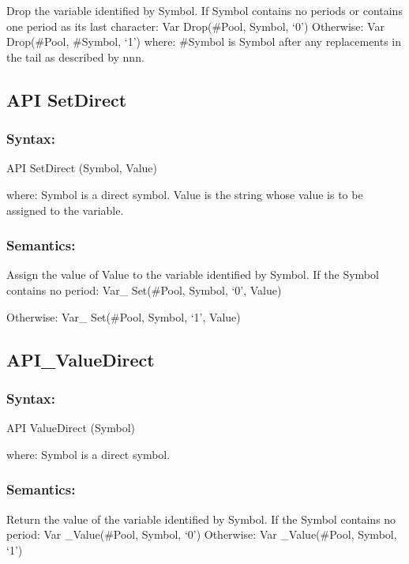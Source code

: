 Drop the variable identified by Symbol. If Symbol contains no periods or
contains one period as its last character: Var Drop(\#Pool, Symbol, `0')
Otherwise: Var Drop(\#Pool, \#Symbol, `1') where: \#Symbol is Symbol
after any replacements in the tail as described by nnn.

\subsection{API SetDirect}\label{api-setdirect}

\subsubsection{Syntax:}\label{syntax-53}

API SetDirect (Symbol, Value)

where: Symbol is a direct symbol. Value is the string whose value is to
be assigned to the variable.

\subsubsection{Semantics:}\label{semantics-54}

Assign the value of Value to the variable identified by Symbol. If the
Symbol contains no period: Var\_ Set(\#Pool, Symbol, `0', Value)

Otherwise: Var\_ Set(\#Pool, Symbol, `1', Value)

\subsection{API\_ValueDirect}\label{api_valuedirect}

\subsubsection{Syntax:}\label{syntax-54}

API ValueDirect (Symbol)

where: Symbol is a direct symbol.

\subsubsection{Semantics:}\label{semantics-55}

Return the value of the variable identified by Symbol. If the Symbol
contains no period: Var \_Value(\#Pool, Symbol, `0') Otherwise: Var
\_Value(\#Pool, Symbol, `1')

